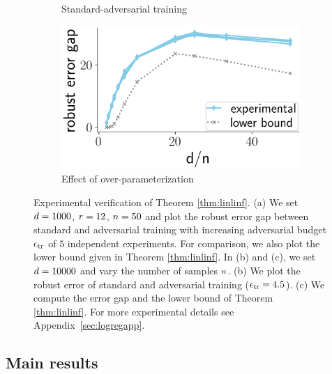 \begin{figure}[!t]
\begin{subfigure}[b]{0.3\textwidth}
  \caption{Standard-adversarial training}
  \label{fig:main_numobs}
\end{subfigure}
\begin{subfigure}[b]{0.3\textwidth}
  \includegraphics[width=0.99\linewidth]{plotsAistats/gap_final_good_colours.png}
  \caption{Effect of over-parameterization}
  \label{fig:main_numobs_bound}
\end{subfigure}
\caption{Experimental verification of Theorem \ref{thm:linlinf}.
(a) We set $d = 1000$, $r = 12$, $n = 50$ and plot the robust error gap between standard and adversarial training with increasing adversarial budget $\epsilon_{\text{tr}}$ of $5$ independent experiments. For comparison, we also plot the lower bound given in Theorem \ref{thm:linlinf}. In (b) and (c), we set $d = 10000$ and vary the number of samples $n$. (b) We plot the robust error of standard and adversarial training ($\epsilon_{\text{tr}} = 4.5$). (c) We compute the error gap and the lower bound of Theorem \ref{thm:linlinf}. For more experimental details see Appendix~\ref{sec:logregapp}.}
  \vspace{-0.2in}
\label{fig:main_theorem}
\end{figure}

\subsection{Main results}
\label{logreg_main_theorem}


